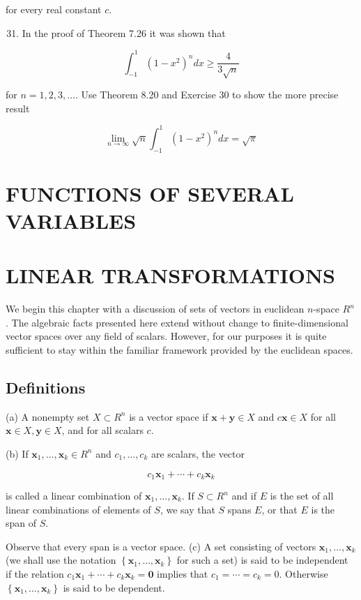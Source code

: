 \documentclass[10pt]{article}
\begin{document}
for every real constant $c$.

\begin{enumerate}
  \setcounter{enumi}{30}
  \item In the proof of Theorem 7.26 it was shown that
\end{enumerate}

$$
\int_{-1}^{1}\left(1-x^{2}\right)^{n} d x \geq \frac{4}{3 \sqrt{n}}
$$

for $n=1,2,3, \ldots$. Use Theorem 8.20 and Exercise 30 to show the more precise result

$$
\lim _{n \rightarrow \infty} \sqrt{n} \int_{-1}^{1}\left(1-x^{2}\right)^{n} d x=\sqrt{\pi}
$$

\section{FUNCTIONS OF SEVERAL VARIABLES}
\section{LINEAR TRANSFORMATIONS}
We begin this chapter with a discussion of sets of vectors in euclidean $n$-space $R^{n}$. The algebraic facts presented here extend without change to finite-dimensional vector spaces over any field of scalars. However, for our purposes it is quite sufficient to stay within the familiar framework provided by the euclidean spaces.

\subsection{Definitions}
(a) A nonempty set $X \subset R^{n}$ is a vector space if $\mathbf{x}+\mathbf{y} \in X$ and $c \mathbf{x} \in X$ for all $\mathbf{x} \in X, \mathbf{y} \in X$, and for all scalars $c$.

(b) If $\mathbf{x}_{1}, \ldots, \mathbf{x}_{k} \in R^{n}$ and $c_{1}, \ldots, c_{k}$ are scalars, the vector

$$
c_{1} \mathbf{x}_{1}+\cdots+c_{k} \mathbf{x}_{k}
$$

is called a linear combination of $\mathbf{x}_{1}, \ldots, \mathbf{x}_{k}$. If $S \subset R^{n}$ and if $E$ is the set of all linear combinations of elements of $S$, we say that $S$ spans $E$, or that $E$ is the span of $S$.

Observe that every span is a vector space. (c) A set consisting of vectors $\mathbf{x}_{1}, \ldots, \mathbf{x}_{k}$ (we shall use the notation $\left\{\mathbf{x}_{1}, \ldots, \mathbf{x}_{k}\right\}$ for such a set) is said to be independent if the relation $c_{1} \mathbf{x}_{1}+\cdots+c_{k} \mathbf{x}_{k}=\mathbf{0}$ implies that $c_{1}=\cdots=c_{k}=0$. Otherwise $\left\{\mathbf{x}_{1}, \ldots, \mathbf{x}_{k}\right\}$ is said to be dependent.
\end{document}

